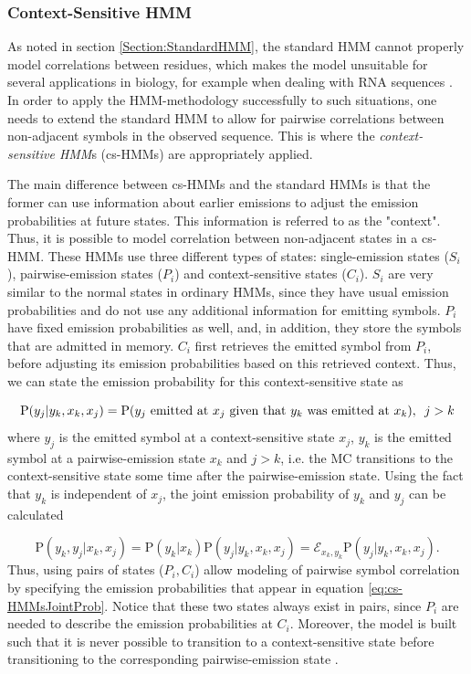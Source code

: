 \documentclass{article}\usepackage[]{graphicx}\usepackage[]{color}
\begin{document}
\subsubsection{Context-Sensitive HMM}
As noted in section \ref{Section:StandardHMM}, the standard HMM cannot properly model correlations between residues, which makes the model unsuitable for several applications in biology, for example when dealing with RNA sequences \cite{Yoon2009}. In order to apply the HMM-methodology successfully to such situations, one needs to extend the standard HMM to allow for pairwise correlations between non-adjacent symbols in the observed sequence. This is where the \textit{context-sensitive HMM}s (cs-HMMs) are appropriately applied.

The main difference between cs-HMMs and the standard HMMs is that the former can use information about earlier emissions to adjust the emission probabilities at future states. This information is referred to as the "context". Thus, it is possible to model correlation between non-adjacent states in a cs-HMM. These HMMs use three different types of states: single-emission states ($S_i$),  pairwise-emission states ($P_i$) and context-sensitive states ($C_i$). $S_i$ are very similar to the normal states in ordinary HMMs, since they have usual emission probabilities and do not use any additional information for emitting symbols. $P_i$ have fixed emission probabilities as well, and, in addition, they store the symbols that are admitted in memory. $C_i$ first retrieves the emitted symbol from $P_i$, before adjusting its emission probabilities based on this retrieved context. Thus, we can state the emission probability for this context-sensitive state as 

\begin{equation*}
    \text{P}(y_j|y_k, x_k, x_j) = \text{P}(y_j\text{ emitted at }x_j\text{ given that }y_k\text{ was emitted at }x_k), \hspace{0.5em} j>k
\end{equation*}
where $y_j$ is the emitted symbol at a context-sensitive state $x_j$, $y_k$ is the emitted symbol at a pairwise-emission state $x_k$ and $j>k$, i.e. the MC transitions to the context-sensitive state some time after the pairwise-emission state. Using the fact that $y_k$ is independent of $x_j$, the joint emission probability of $y_k$ and $y_j$ can be calculated

\begin{equation}
    \text{P}(y_k, y_j|x_k, x_j) = \text{P}(y_k|x_k)\text{P}(y_j|y_k, x_k, x_j) = \mathcal{E}_{x_k, y_k}\text{P}(y_j|y_k, x_k, x_j).
    \label{eq:cs-HMMsJointProb}
\end{equation}
Thus, using pairs of states ($P_i, C_i$) allow modeling of pairwise symbol correlation by specifying the emission probabilities that appear in equation \eqref{eq:cs-HMMsJointProb}. Notice that these two states always exist in pairs, since $P_i$ are needed to describe the emission probabilities at $C_i$. Moreover, the model is built such that it is never possible to transition to a context-sensitive state before transitioning to the corresponding pairwise-emission state \cite{Yoon2009}. 
\end{document}
